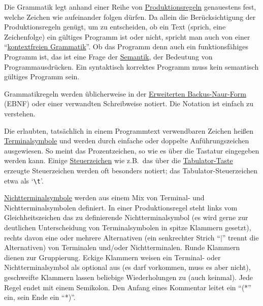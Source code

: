 Die Grammatik legt anhand einer Reihe von \href{http://de.wikipedia.org/wiki/Produktionsregel}{Produktionsregeln} genauestens fest, welche Zeichen wie aufeinander folgen dürfen. Da allein die Berücksichtigung der Produktionsregeln genügt, um zu entscheiden, ob ein Text (sprich, eine Zeichenfolge) ein gültiges Programm ist oder nicht, spricht man auch von einer "`\href{http://de.wikipedia.org/wiki/Kontextfreie\_Grammatik}{kontextfreien Grammatik}"'. Ob das Programm denn auch ein funktionsfähiges Programm ist, das ist eine Frage der \href{http://de.wikipedia.org/wiki/Semantik#Semantik\_in\_formalen\_Sprachen}{Semantik}, der Bedeutung von Programmausdrücken. Ein syntaktisch korrektes Programm muss kein semantisch gültiges Programm sein.


Grammatikregeln werden üblicherweise in der \href{http://de.wikipedia.org/wiki/Erweiterte\_Backus-Naur-Form}{Erweiterten Backus-Naur-Form} (EBNF) oder einer verwandten Schreibweise notiert. Die Notation ist einfach zu verstehen. 

Die erlaubten, tatsächlich in einem Programmtext verwendbaren Zeichen heißen \href{http://de.wikipedia.org/wiki/Terminalsymbol}{Terminalsymbole} und werden durch einfache oder doppelte Anführungszeichen ausgewiesen. So meint \lit{\%}
das Prozentzeichen, so wie es über die Tastatur eingegeben werden kann. Einige \href{http://de.wikipedia.org/wiki/Steuerzeichen}{Steuerzeichen} wie z.B.\ das über die \href{http://de.wikipedia.org/wiki/Tabulatortaste}{Tabulator-Taste} erzeugte Steuerzeichen werden oft besonders notiert; das Tabulator-Steuerzeichen etwa als `\verb|\t|'.

\href{http://de.wikipedia.org/wiki/Nichtterminalsymbol}{Nichtterminalsymbole} werden aus einem Mix von Terminal- und Nichtterminalsymbolen definiert. In einer Produktionsregel steht links vom Gleichheitszeichen das zu definierende Nichtterminalsymbol (es wird gerne zur deutlichen Unterscheidung von Terminalsymbolen in spitze Klammern gesetzt), rechts davon eine oder mehrere Alternativen (ein senkrechter Strich "`$|$"' trennt die Alternativen) von Terminalen und\slash oder Nichtterminalen. Runde Klammern dienen zur Gruppierung. Eckige Klammern weisen ein Terminal- oder Nichtterminalsymbol als optional aus (es darf vorkommen, muss es aber nicht), geschweifte Klammern lassen beliebige Wiederholungen zu (auch keinmal). Jede Regel endet mit einem Semikolon. Den Anfang eines Kommentar leitet ein "`(*"' ein, sein Ende ein "`*)"'.

